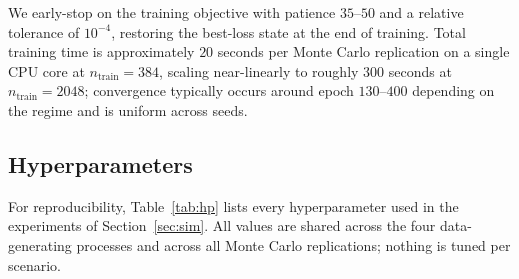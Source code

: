 We early-stop on the training objective with patience $35$--$50$ and a
relative tolerance of $10^{-4}$, restoring the best-loss state at the
end of training. Total training time is approximately $20$ seconds per
Monte Carlo replication on a single CPU core at $n_{\text{train}} = 384$,
scaling near-linearly to roughly $300$ seconds at $n_{\text{train}} = 2048$;
convergence typically occurs around epoch $130$--$400$ depending on the
regime and is uniform across seeds.

\subsection{Hyperparameters}
\label{sec:hp}

For reproducibility, Table~\ref{tab:hp} lists every hyperparameter used in
the experiments of Section~\ref{sec:sim}. All values are shared across the
four data-generating processes and across all Monte Carlo replications;
nothing is tuned per scenario.


